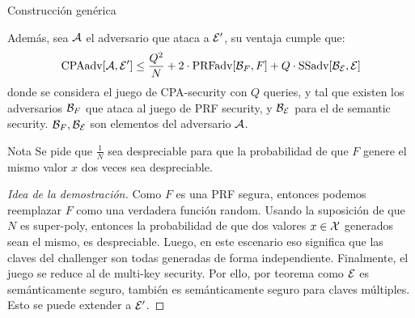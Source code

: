 \begin{frame}[allowframebreaks]{Construcción genérica}
\begin{theorem}
    Además, sea $\mathcal{A}$ el adversario que ataca a $\mathcal{E}'$, su ventaja cumple que:
    \begin{equation*}
      \text{CPAadv}[\mathcal{A}, \mathcal{E}'] \leq \frac{Q^2}{N} + 2 \cdot \text{PRFadv}[\mathcal{B}_F, F] + Q \cdot \text{SSadv}[\mathcal{B}_{\mathcal{E}}, \mathcal{E}]
    \end{equation*}
    donde se considera el juego de CPA-security con $Q$ queries, y tal que existen los 
    adversarios $\mathcal{B}_F$ que ataca al juego de PRF security, y $\mathcal{B}_{\mathcal{E}}$ para el de semantic security.
    $\mathcal{B}_F, \mathcal{B}_{\mathcal{E}}$ son elementos del adversario $\mathcal{A}$.
  \end{theorem}
  \begin{block}{Nota}
    Se pide que $\frac{1}{N}$ sea despreciable para que la probabilidad de que $F$ genere el mismo 
    valor $x$ dos veces sea despreciable.
  \end{block}
  \begin{proof}[Idea de la demostración]
    Como $F$ es una PRF segura, entonces podemos reemplazar $F$ como una verdadera función random.
    Usando la suposición de que $N$ es super-poly, entonces la probabilidad de que dos valores
    $x \in \mathcal{X}$ generados sean el mismo, es despreciable.
    Luego, en este escenario eso significa que las claves del challenger son todas generadas 
    de forma independiente.
    Finalmente, el juego se reduce al de multi-key security.
    Por ello, por teorema como $\mathcal{E}$ es semánticamente seguro, también es semánticamente seguro 
    para claves múltiples.
    Esto se puede extender a $\mathcal{E}'$.
  \end{proof}
\end{frame}

